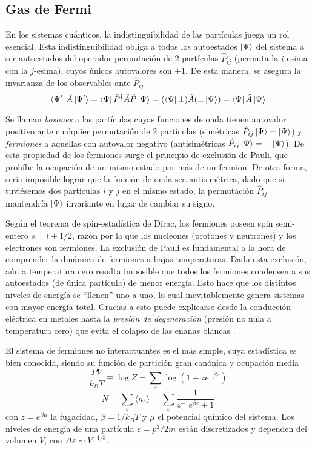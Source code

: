 \subsection{Gas de Fermi}{\label{sec:intro_fermi_gas}}

En los sistemas cuánticos, la indistinguibilidad de las partículas juega un rol esencial.
Esta indistinguibilidad obliga a todos los autoestados $\ket{\Psi}$ del sistema a ser autoestados del operador permutación de 2 partículas $\hat{P}_{ij}$ (permuta la $i$-esima con la $j$-esima), cuyos únicos autovalores son $\pm 1$.
De esta manera, se asegura la invarianza de los observables ante $\hat{P}_{ij}$
\[\bra{\Psi'}\hat{A}\ket{\Psi'} = \bra{\Psi}\hat{P}^\dagger\hat{A}\hat{P}\ket{\Psi} = (\bra{\Psi}\pm)\hat{A}(\pm\ket{\Psi}) = \bra{\Psi}\hat{A}\ket{\Psi}\]

Se llaman \textit{bosones} a las partículas cuyas funciones de onda tienen autovalor positivo ante cualquier permutación de 2 partículas (simétricas $\hat{P}_{ij}\ket{\Psi} = \ket{\Psi}$) y \textit{fermiones} a aquellas con autovalor negativo (antisimétricas $\hat{P}_{ij}\ket{\Psi} = -\ket{\Psi}$).
De esta propiedad de los fermiones surge el principio de exclusión de Pauli, que prohíbe la ocupación de un mismo estado por más de un fermion.
De otra forma, sería imposible lograr que la función de onda sea antisimétrica, dado que si tuviésemos dos partículas $i$ y $j$ en el mismo estado, la permutación $\hat{P}_{ij}$ mantendría
$\ket{\Psi}$ invariante en lugar de cambiar su signo.

Según el teorema de spin-estadística de Dirac\cite{Pauli1940}, los fermiones poseen spin semi-entero $s=l+1/2$, razón por la que los nucleones (protones y neutrones) y los electrones son fermiones.
La exclusión de Pauli es fundamental a la hora de comprender la dinámica de fermiones a bajas temperaturas.
Dada esta exclusión, aún a temperatura cero resulta imposible que todos los fermiones condensen a sus autoestados (de única partícula) de menor energía. 
Esto hace que los distintos niveles de energía se ``llenen'' uno a uno, lo cual inevitablemente genera sistemas con mayor energía total.
Gracias a esto puede explicarse desde la conducción eléctrica en metales\cite[pp. 247]{BOOK:PATHRIA} hasta la \textit{presión de degeneración} 
(presión no nula a temperatura cero) que evita el colapso de las enanas blancas \cite[pp. 259]{BOOK:PATHRIA}.

El sistema de fermiones no interactuantes es el más simple, cuya estadística es bien conocida, siendo su función de partición gran canónica y ocupación media\cite[pp. 231]{BOOK:PATHRIA}
\begin{equation}
 \frac{PV}{k_BT} \equiv \log Z = \sum_\varepsilon \log(1+ze^{-\beta\varepsilon})
\end{equation}
\begin{equation}
 N = \sum_\varepsilon \langle n_\varepsilon\rangle = \sum_\varepsilon \frac{1}{z^{-1}e^{\beta\varepsilon}+1}
\end{equation}
con $z=e^{\beta\mu}$ la fugacidad, $\beta=1/k_BT$ y $\mu$ el potencial químico del sistema.
Los niveles de energía de una partícula $\varepsilon=p^2/2m$ están discretizados y dependen del volumen $V$, con $\Delta\varepsilon\sim V^{-1/3}$.

